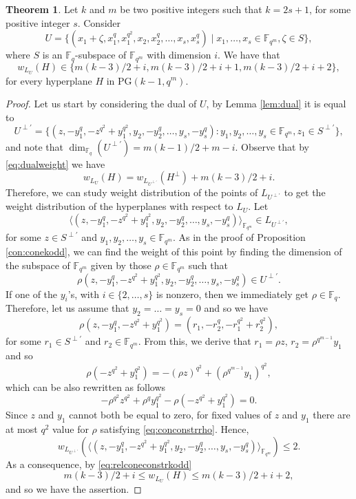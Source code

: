 \documentclass[11pt]{amsart}
\theoremstyle{definition}
\newtheorem{theorem}{Theorem}[section]
\newcommand{\fq}{{\mathbb F}_{q}}
\newcommand{\la}{\langle}
\newcommand{\ra}{\rangle}
\newcommand{\fqm}{\mathbb{F}_{q^m}}
\begin{document}
\begin{theorem}\label{thm:conekoddhyper}
    Let $k$ and $m$ be two positive integers such that $k=2s+1$, for some positive integer $s$.
    Consider
    $$U=\{(x_1+\zeta,x_1^q,x_1^{q^2}, x_2, x_2^{q}, \ldots, x_s,x_s^{q} )\mid x_1,\ldots,x_s\in \mathbb{F}_{q^m}, \zeta\in S\},$$
    where $S$ is an $\fq$-subspace of $\fqm$ with dimension $i$. We have that 
    \[ w_{L_U}(H) \in \{m(k-3)/2+i,m(k-3)/2+i+1,m(k-3)/2+i+2\}, \]
    for every hyperplane $H$ in $\mathrm{PG}(k-1,q^m)$.
\end{theorem}
\begin{proof}
    Let us start by considering the dual of $U$, by Lemma \ref{lem:dual} it is equal to
    \[U^{\perp'}=\{(z,-y_1^q,-z^{q^2}+y_1^{q^2},y_2,-y_2^q,\ldots,y_s,-y_s^q) \colon  y_1,y_2,\ldots,y_s \in \fqm, z_1 \in S^{\perp'}\},\]
    and note that $\dim_{\fq}(U^{\perp'})=m(k-1)/2+m-i$.
    Observe that by \eqref{eq:dualweight} we have 
    \begin{equation}\label{eq:relconeconstrkodd}
    w_{L_U}(H)=w_{L_{U^{\perp'}}}(H^\perp)+m(k-3)/2+i.
    \end{equation}
    Therefore, we can study weight distribution of the points of $L_{U^{\perp'}}$ to get the weight distribution of the hyperplanes with respect to $L_U$.
    Let 
    \[ \la (z,-y_1^q,-z^{q^2}+y_1^{q^2},y_2,-y_2^q,\ldots,y_s,-y_s^q)  \ra_{\fqm}\in L_{U^{\perp'}}, \]
    for some $z \in S^{\perp'}$ and $y_1,y_2,\ldots,y_s \in \fqm$. As in the proof of Proposition \ref{con:conekodd}, we can find the weight of this point by finding the dimension of the subspace of $\fqm$ given by those $\rho \in \fqm$ such that
    \[ \rho(z,-y_1^q,-z^{q^2}+y_1^{q^2},y_2,-y_2^q,\ldots,y_s,-y_s^q) \in U^{\perp'}. \]
    If one of the $y_i$'s, with $i \in \{2,\ldots,s\}$ is nonzero, then we immediately get $\rho \in \fq$.
    Therefore, let us assume that $y_2=\ldots=y_s=0$ and so we have
    \[\rho(z,-y_1^q,-z^{q^2}+y_1^{q^2})=(r_1,-r_2^q,-r_1^{q^2}+r_2^{q^2}),\]
    for some $r_1 \in S^{\perp'}$ and $r_2 \in \fqm$. From this, we derive that $r_1=\rho z$, $r_2=\rho^{q^{m-1}}y_1$ and so
    \[\rho(-z^{q^2}+y_1^{q^2})=-(\rho z)^{q^2}+(\rho^{q^{m-1}}y_1)^{q^2},\]
    which can be also rewritten as follows
    \begin{equation}\label{eq:conconstrrho} 
    -\rho^{q^2}z^{q^2}+\rho^q y_1^{q^2}-\rho(-z^{q^2}+y_1^{q^2})=0.
    \end{equation}
    Since $z$ and $y_1$ cannot both be equal to zero, for fixed values of $z$ and $y_1$ there are at most $q^2$ value for $\rho$ satisfying \eqref{eq:conconstrrho}.
    Hence, \[
    w_{L_{U^{\perp'}}}(\la (z,-y_1^q,-z^{q^2}+y_1^{q^2},y_2,-y_2^q,\ldots,y_s,-y_s^q)  \ra_{\fqm})\leq 2.
    \]
    As a consequence, by \eqref{eq:relconeconstrkodd}
    \[m(k-3)/2+i\leq w_{L_U}(H)\leq m(k-3)/2+i+2,\]
    and so we have the assertion.
\end{proof}
\end{document}
